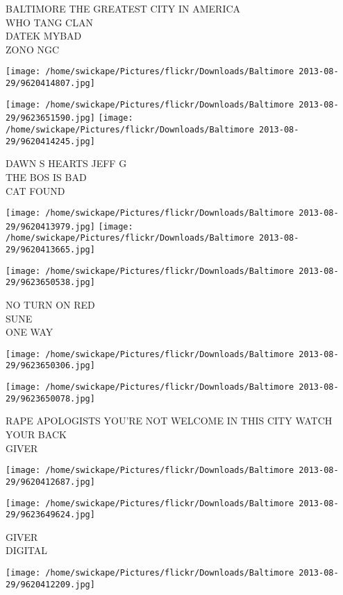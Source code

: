 \documentclass[10pt,letterpaper]{article}
\begin{document}
BALTIMORE THE GREATEST CITY IN AMERICA\\
WHO TANG CLAN\\
DATEK MYBAD\\
ZONO NGC
\pagebreak

\texttt{[image: /home/swickape/Pictures/flickr/Downloads/Baltimore 2013-08-29/9620414807.jpg]}

\vspace{0.25in}
\texttt{[image: /home/swickape/Pictures/flickr/Downloads/Baltimore 2013-08-29/9623651590.jpg]}
\texttt{[image: /home/swickape/Pictures/flickr/Downloads/Baltimore 2013-08-29/9620414245.jpg]}

DAWN S HEARTS JEFF G\\
THE BOS IS BAD\\
CAT FOUND
\pagebreak

\texttt{[image: /home/swickape/Pictures/flickr/Downloads/Baltimore 2013-08-29/9620413979.jpg]}
\texttt{[image: /home/swickape/Pictures/flickr/Downloads/Baltimore 2013-08-29/9620413665.jpg]}

\vspace{0.25in}
\texttt{[image: /home/swickape/Pictures/flickr/Downloads/Baltimore 2013-08-29/9623650538.jpg]}

NO TURN ON RED\\
SUNE\\
ONE WAY
\pagebreak

\texttt{[image: /home/swickape/Pictures/flickr/Downloads/Baltimore 2013-08-29/9623650306.jpg]}

\vspace{0.25in}
\texttt{[image: /home/swickape/Pictures/flickr/Downloads/Baltimore 2013-08-29/9623650078.jpg]}

RAPE APOLOGISTS YOU'RE NOT WELCOME IN THIS CITY WATCH YOUR BACK\\
GIVER
\pagebreak

\texttt{[image: /home/swickape/Pictures/flickr/Downloads/Baltimore 2013-08-29/9620412687.jpg]}

\vspace{0.25in}
\texttt{[image: /home/swickape/Pictures/flickr/Downloads/Baltimore 2013-08-29/9623649624.jpg]}

GIVER\\
DIGITAL
\pagebreak

\texttt{[image: /home/swickape/Pictures/flickr/Downloads/Baltimore 2013-08-29/9620412209.jpg]}
\end{document}
